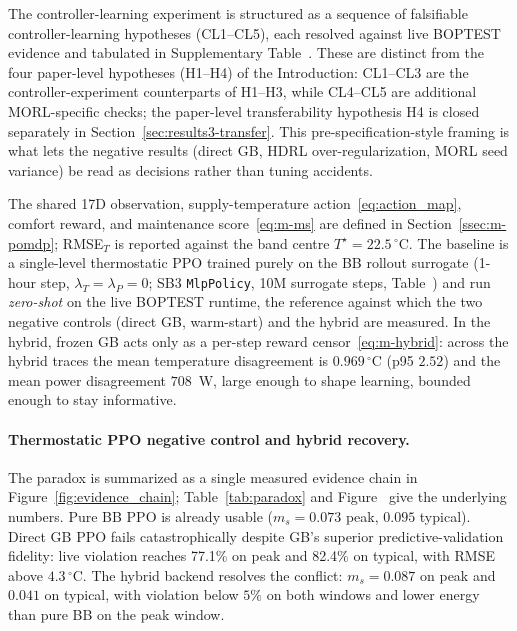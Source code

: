 The controller-learning experiment is structured as a sequence of falsifiable controller-learning hypotheses (CL1--CL5), each resolved against live BOPTEST evidence and tabulated in Supplementary Table~. These are distinct from the four paper-level hypotheses (H1--H4) of the Introduction: CL1--CL3 are the controller-experiment counterparts of H1--H3, while CL4--CL5 are additional MORL-specific checks; the paper-level transferability hypothesis H4 is closed separately in Section~\ref{sec:results3-transfer}. This pre-specification-style framing is what lets the negative results (direct GB, HDRL over-regularization, MORL seed variance) be read as decisions rather than tuning accidents.

The shared 17D observation, supply-temperature action~\eqref{eq:action_map}, comfort reward, and maintenance score~\eqref{eq:m-ms} are defined in Section~\ref{ssec:m-pomdp}; RMSE$_T$ is reported against the band centre $T^{\star}=22.5\,^\circ$C. The baseline is a single-level thermostatic PPO trained purely on the BB rollout surrogate (1-hour step, $\lambda_T=\lambda_P=0$; SB3 \texttt{MlpPolicy}, 10M surrogate steps, Table~) and run \emph{zero-shot} on the live BOPTEST runtime, the reference against which the two negative controls (direct GB, warm-start) and the hybrid are measured. In the hybrid, frozen GB acts only as a per-step reward censor~\eqref{eq:m-hybrid}: across the hybrid traces the mean temperature disagreement is $0.969\,^\circ$C (p95 $2.52$) and the mean power disagreement $708$~W, large enough to shape learning, bounded enough to stay informative.

\paragraph{Thermostatic PPO negative control and hybrid recovery.}

The paradox is summarized as a single measured evidence chain in Figure~\ref{fig:evidence_chain}; Table~\ref{tab:paradox} and Figure~ give the underlying numbers. Pure BB PPO is already usable ($m_s=0.073$ peak, $0.095$ typical). Direct GB PPO fails catastrophically despite GB's superior predictive-validation fidelity: live violation reaches 77.1\% on peak and 82.4\% on typical, with RMSE above $4.3\,^\circ$C. The hybrid backend resolves the conflict: $m_s=0.087$ on peak and $0.041$ on typical, with violation below $5\%$ on both windows and lower energy than pure BB on the peak window.

